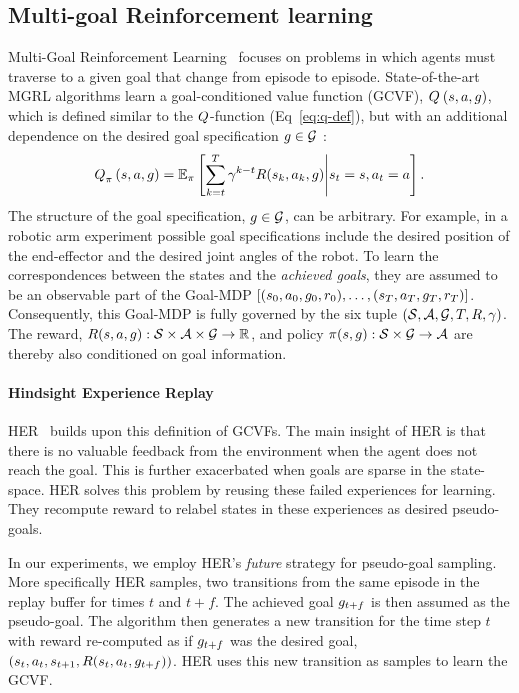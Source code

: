 \subsection{Multi-goal Reinforcement learning}
Multi-Goal Reinforcement Learning~\citep{plappert2018multi} focuses on problems
in which agents must traverse to a given goal that change from
episode to episode.
State-of-the-art MGRL algorithms learn a goal-conditioned value
function (GCVF), $Q_{}^{}\left({s}, {a}, {g}\right)$, which is defined
similar to the $Q$-function (Eq~\ref{eq:q-def}), but with an additional
dependence on the desired goal specification $g \in \mathcal{G}$ :
%
\begin{align}
Q_{\pi}^{}\left({s}, {a}, {g}\right) = \mathbb{E}_\pi\left[ \sum_{k=t}^T
  \gamma^{k-t} R(s_k, a_k, g)
  \middle| s_t = s, a_t = a \right] .
  \label{eq:q-def}
\end{align}%
%
The structure of the goal specification, $g \in \mathcal{G}$, can be
arbitrary. For example, in a robotic
arm experiment possible goal specifications include the desired position of the
end-effector and the desired joint angles of the robot.
To learn the correspondences between the states and the \emph{achieved goals}, they are
assumed to be an observable part of the Goal-MDP $[(s_0, a_0,
g_0, r_0), \dots, (s_T, a_T, g_T, r_T)]$.
Consequently, this Goal-MDP is fully governed by the six tuple $(\mathcal{S},
\mathcal{A},\mathcal{G}, T, R, \gamma)$. The reward, $R(s,a,
g) : \mathcal{S} \times \mathcal{A}\times \mathcal{G} \rightarrow \mathbb{R} $, and policy
$\pi(s, g): \mathcal{S} \times \mathcal{G} \rightarrow \mathcal{A} $ are
thereby also conditioned on goal information.


\paragraph{Hindsight Experience Replay}
HER~\citep{andrychowicz2017hindsight}
builds upon this definition of GCVFs.  The main insight of HER is that there is
no valuable feedback from the environment when the agent does not reach
the goal. This is further exacerbated when goals are
sparse in the state-space. 
HER solves this problem by reusing these failed experiences for learning.
They recompute reward to relabel states in these experiences as desired pseudo-goals.

In our experiments, we employ HER's \emph{future} strategy for
pseudo-goal sampling. More specifically HER samples, two transitions
from the same episode in the replay buffer for times $t$ and $t+f$.
The achieved goal $g_{t+f}$ is then assumed as the pseudo-goal.
The algorithm then generates a new transition for the time step $t$
with reward re-computed as if $g_{t+f}$ was the desired goal,
$(s_{t}, a_t, s_{t+1}, R(s_t, a_t, g_{t+f}))$.
HER uses this new transition as samples to learn the GCVF.




